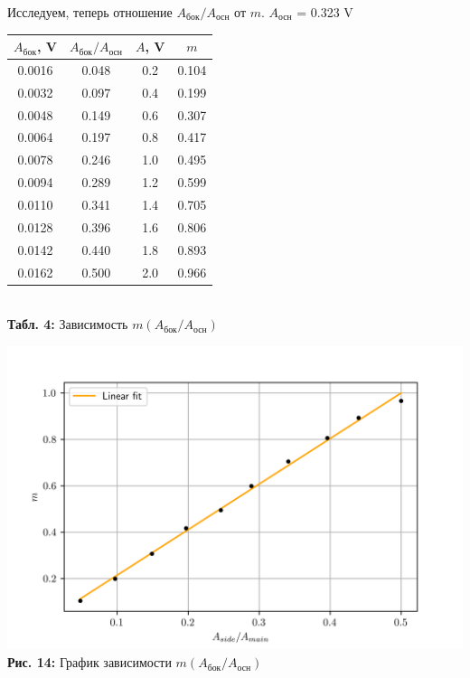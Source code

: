 \documentclass[12pt,a4paper]{scrartcl}
\begin{document}
	Исследуем, теперь отношение $A_{\text{бок}} / A_{\text{осн}}$ от $m$. $A_{\text{осн}}$ = 0.323 V
	
	\begin{center}
		\begin{tabular}{|c|c|c|c|}
			\hline
			$A_{\text{бок}}$, V & $A_{\text{бок}} / A_{\text{осн}}$ & $A$, V & $m$
			\\\hline
			0.0016 & 0.048 & 0.2 & 0.104
			\\\hline
			0.0032 & 0.097 & 0.4 & 0.199
			\\\hline
			0.0048 & 0.149 & 0.6 & 0.307
			\\\hline
			0.0064 & 0.197 & 0.8 & 0.417
			\\\hline
			0.0078 & 0.246 & 1.0 & 0.495
			\\\hline
			0.0094 & 0.289 & 1.2 & 0.599
			\\\hline
			0.0110 & 0.341 & 1.4 & 0.705
			\\\hline
			0.0128 & 0.396 & 1.6 & 0.806
			\\\hline
			0.0142 & 0.440 & 1.8 & 0.893
			\\\hline
			0.0162 & 0.500 & 2.0 & 0.966
			\\\hline
		\end{tabular}
		\\\textbf{Табл. 4:} Зависимость $m(A_{\text{бок}} / A_{\text{осн}})$
	\end{center}

	\begin{center}
		\includegraphics[scale=0.95]{PIC_14.png}
		\\\textbf{Рис. 14:} График зависимости $m(A_{\text{бок}} / A_{\text{осн}})$
	\end{center}
	
\end{document}
